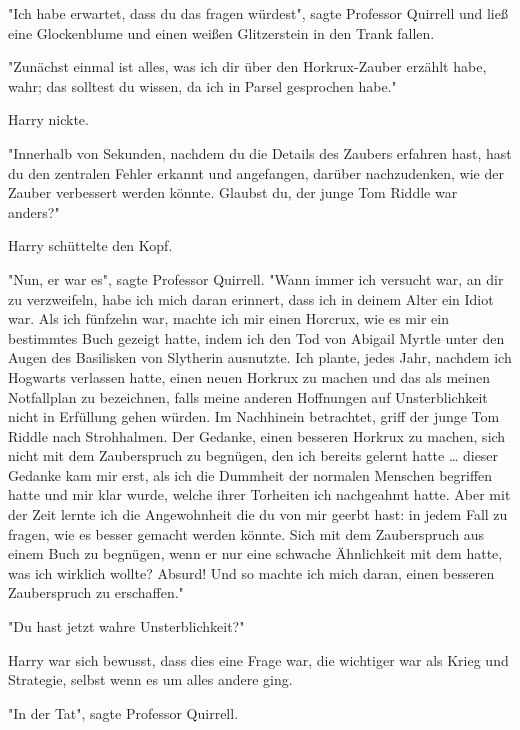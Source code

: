 {"Ich habe erwartet, dass du das fragen würdest", sagte Professor Quirrell und ließ eine Glockenblume und einen weißen Glitzerstein in den Trank fallen.

"Zunächst einmal ist alles, was ich dir über den Horkrux-Zauber erzählt habe, wahr; das solltest du wissen, da ich in Parsel gesprochen habe."

Harry nickte.

"Innerhalb von Sekunden, nachdem du die Details des Zaubers erfahren hast, hast du den zentralen Fehler erkannt und angefangen, darüber nachzudenken, wie der Zauber verbessert werden könnte. Glaubst du, der junge Tom Riddle war anders?"

Harry schüttelte den Kopf.

"Nun, er war es", sagte Professor Quirrell. "Wann immer ich versucht war, an dir zu verzweifeln, habe ich mich daran erinnert, dass ich in deinem Alter ein Idiot war. Als ich fünfzehn war, machte ich mir einen Horcrux, wie es mir ein bestimmtes Buch gezeigt hatte, indem ich den Tod von Abigail Myrtle unter den Augen des Basilisken von Slytherin ausnutzte. Ich plante, jedes Jahr, nachdem ich Hogwarts verlassen hatte, einen neuen Horkrux zu machen und das als meinen Notfallplan zu bezeichnen, falls meine anderen Hoffnungen auf Unsterblichkeit nicht in Erfüllung gehen würden. Im Nachhinein betrachtet, griff der junge Tom Riddle nach Strohhalmen. Der Gedanke, einen besseren Horkrux zu machen, sich nicht mit dem Zauberspruch zu begnügen, den ich bereits gelernt hatte … dieser Gedanke kam mir erst, als ich die Dummheit der normalen Menschen begriffen hatte und mir klar wurde, welche ihrer Torheiten ich nachgeahmt hatte. Aber mit der Zeit lernte ich die Angewohnheit die du von mir geerbt hast: in jedem Fall zu fragen, wie es besser gemacht werden könnte. Sich mit dem Zauberspruch aus einem Buch zu begnügen, wenn er nur eine schwache Ähnlichkeit mit dem hatte, was ich wirklich wollte? Absurd! Und so machte ich mich daran, einen besseren Zauberspruch zu erschaffen."

"Du hast jetzt wahre Unsterblichkeit?"

Harry war sich bewusst, dass dies eine Frage war, die wichtiger war als Krieg und Strategie, selbst wenn es um alles andere ging.

"In der Tat", sagte Professor Quirrell.

}
